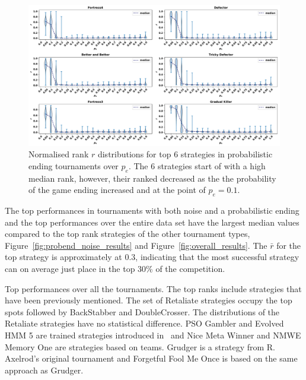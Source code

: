 \documentclass{article}
\begin{document}
\begin{figure}[!htbp]
    \centering
    \includegraphics[width=.92\textwidth]{../images/folk_theorem.pdf}
    \caption{Normalised rank \(r\) distributions for top 6 strategies in probabilistic ending tournaments
    over $p_e$. The 6 strategies start of with a high median rank,
    however, their ranked decreased as the the probability of the game ending
    increased and at the point of \(p_e = 0.1\).}
    \label{fig:effect_of_probend}
\end{figure}

The top performances in tournaments with both noise and a probabilistic ending
and the top performances over the entire data set have the largest median values
compared to the top rank strategies of the other tournament types,
Figure~\ref{fig:probend_noise_results} and Figure~\ref{fig:overall_results}. The
\(\bar{r}\) for the top strategy is approximately at 0.3, indicating that the
most successful strategy can on average just place in the top 30\% of the
competition.

\begin{table}[!htbp]
    \centering
    \resizebox{.30\textwidth}{!}{
    }
    \caption{Top performances over all the tournaments. The top ranks include
    strategies that have been previously mentioned. The set of Retaliate
    strategies occupy the top spots followed by BackStabber and DoubleCrosser.
    The distributions of the Retaliate strategies have no statistical
    difference. PSO Gambler and Evolved HMM 5 are trained strategies introduced
    in~\cite{Harper2017} and Nice Meta Winner and NMWE Memory One are strategies
    based on teams. Grudger is a strategy from R. Axelrod's original tournament and
    Forgetful Fool Me Once is based on the same approach as
    Grudger.}\label{table:overall_results}
\end{table}
\end{document}
